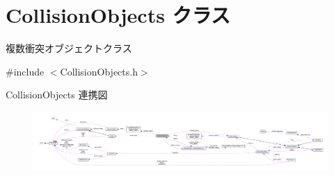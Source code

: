 \hypertarget{class_collision_objects}{}\section{Collision\+Objects クラス}
\label{class_collision_objects}


複数衝突オブジェクトクラス  




{\ttfamily \#include $<$Collision\+Objects.\+h$>$}



Collision\+Objects 連携図\nopagebreak
\begin{figure}[H]
\begin{center}
\leavevmode
\includegraphics[width=350pt]{class_collision_objects__coll__graph}
\end{center}
\end{figure}
